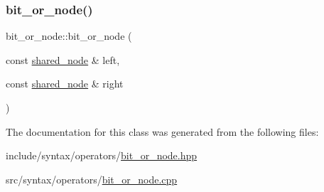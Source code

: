 \subsubsection{\texorpdfstring{bit\+\_\+or\+\_\+node()}{bit\_or\_node()}}
{\footnotesize\ttfamily bit\+\_\+or\+\_\+node\+::bit\+\_\+or\+\_\+node (\begin{DoxyParamCaption}\item[{const \hyperlink{namespacejawe_a3f307481d921b6cbb50cc8511fc2b544}{shared\+\_\+node} \&}]{left,  }\item[{const \hyperlink{namespacejawe_a3f307481d921b6cbb50cc8511fc2b544}{shared\+\_\+node} \&}]{right }\end{DoxyParamCaption})}



The documentation for this class was generated from the following files\+:\begin{DoxyCompactItemize}
\item 
include/syntax/operators/\hyperlink{bit__or__node_8hpp}{bit\+\_\+or\+\_\+node.\+hpp}\item 
src/syntax/operators/\hyperlink{bit__or__node_8cpp}{bit\+\_\+or\+\_\+node.\+cpp}\end{DoxyCompactItemize}
